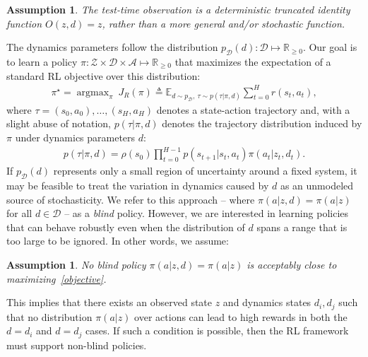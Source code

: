 \documentclass{article}
\newcommand{\R}{\mathbb{R}}
\newcommand{\E}{\mathbb{E}}
\newcommand{\TODO}[1]{\textcolor{red}{\textbf{TODO: #1}}}
\newcommand{\cA}{\mathcal{A}}
\newcommand{\cS}{\mathcal{S}}
\DeclareMathOperator*{\argmax}{argmax}
\newcommand{\sysid}{dynamics}
\newcommand{\blind}{\emph{blind}}
\newcommand{\obset}{\mathcal{Z}}
\newcommand{\idset}{\mathcal{D}}
\newcommand{\obvar}{z}
\newcommand{\idvar}{d}
\newcommand{\idpdf}{p_{\idset}}
\newtheorem{assumption}[theorem]{Assumption}
\begin{document}
\begin{assumption}
The test-time observation is a deterministic truncated identity function $O(\obvar, \idvar) = \obvar$,
rather than a more general and/or stochastic function.
\label{observation}
\end{assumption}
%
The \sysid{} parameters follow the distribution $\idpdf(\idvar) : \idset \mapsto \R_{\geq 0}$.
Our goal is to learn a policy $\pi: \obset \times \idset \times \cA \mapsto \R_{\geq 0}$
that maximizes the expectation of a standard RL objective over this distribution:
\begin{equation}\begin{split}
\pi^\star = \argmax_\pi\ J_R(\pi) \triangleq \E_{\idvar \sim \idpdf,\ \tau \sim p(\tau|\pi,\idvar)} \sum_{t = 0}^H
r(s_t, a_t),
\label{objective}
\end{split}\end{equation}
where $\tau = (s_0, a_0), \dots, (s_H, a_H)$ denotes a state-action trajectory and, with a slight abuse of notation, 
$p(\tau | \pi, \idvar)$ denotes the trajectory distribution induced by $\pi$ under \sysid{} parameters $\idvar$:
\begin{equation}\begin{split}
p(\tau | \pi, \idvar) = \rho(s_0) \prod_{t=0}^{H-1} p(s_{t+1} | s_t, a_t) \pi(a_t|\obvar_t, \idvar_t).
\end{split}\end{equation}
If $\idpdf(\idvar)$ represents only a small region of uncertainty around a fixed system,
it may be feasible to treat the variation in dynamics caused by $\idvar$
as an unmodeled source of stochasticity.
We refer to this approach -- where
$\pi(a|\obvar,\idvar) = \pi(a|\obvar)$ for all $\idvar \in \idset$ --
as a \blind{} policy.
However, we are interested in learning policies that can behave robustly even when the distribution of $d$
spans a range that is too large to be ignored.
In other words, we assume:
\begin{assumption}
No \blind{} policy $\pi(a|\obvar,\idvar) = \pi(a|\obvar)$
is acceptably close to maximizing~\eqref{objective}.
\label{noblind}
\end{assumption}
This implies that there exists an observed state $\obvar$ and \sysid{} states $\idvar_i, \idvar_j$
such that no distribution $\pi(a|\obvar)$ over actions can lead to high rewards
in both the $\idvar = \idvar_i$ and $\idvar = \idvar_j$ cases.
If such a condition is possible, then the RL framework must support non-blind policies.
\end{document}
